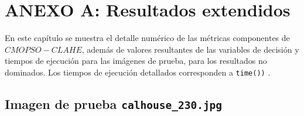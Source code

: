 \chapter*{ANEXO A: Resultados extendidos}
\label{ch:anexo}

En este capítulo se muestra el detalle numérico de las métricas componentes de $CMOPSO-CLAHE$, además de valores resultantes de las variables de decisión y tiempos de ejecución para las imágenes de prueba, para los resultados no dominados. Los tiempos de ejecución detallados corresponden a \texttt{time())} \cite{time}.


\section{Imagen de prueba \texttt{calhouse\_230.jpg}}

